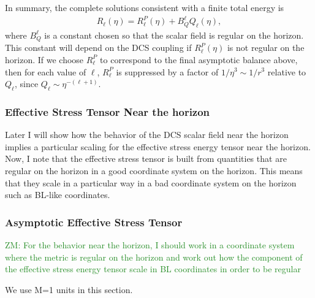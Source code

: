 \documentclass[aps,prd,amsmath,showpacs,amssymb,superscriptaddress,nofootinbib,longbibliography,eqsecnum,preprintnumbers]{revtex4-1}
\newcommand{\zach}[1]{\textcolor{ForestGreen}{#1}}
\begin{document}
In summary, the complete solutions consistent with a finite total energy is 
\begin{align}
R_\ell(\eta)=R_\ell^P(\eta) +B_Q^\ell Q_\ell(\eta),
\end{align} 
where $B_Q^\ell$ is a constant chosen so that the scalar field is regular on the horizon. This constant will depend on the DCS coupling if $R_\ell^P(\eta) $ is not regular on the horizon. If we choose $R_\ell^P$ to correspond to the final asymptotic balance above, then for each value of $\ell$, $R_\ell^P$ is suppressed by a factor of $1/\eta^3\sim 1/r^3$ relative to $Q_\ell$, since $Q_\ell\sim \eta^{-(\ell +1)}$.


\subsubsection{Effective Stress Tensor Near the horizon}
Later I will show how the behavior of the DCS scalar field near the horizon implies a particular scaling for the effective stress energy tensor near the horizon. Now, I note that the effective stress tensor is built from quantities that are regular on the horizon in a good coordinate system on the horizon. This means that they scale in a particular way in a bad coordinate system on the horizon such as BL-like coordinates.

\subsubsection{Asymptotic Effective Stress Tensor}

\zach{ZM: For the behavior near the horizon, I should work in a coordinate system where the metric is regular on the horizon and work out how the component of the effective stress energy tensor scale in BL coordinates in order to be regular }

We use M=1 units in this section. 
\end{document}
